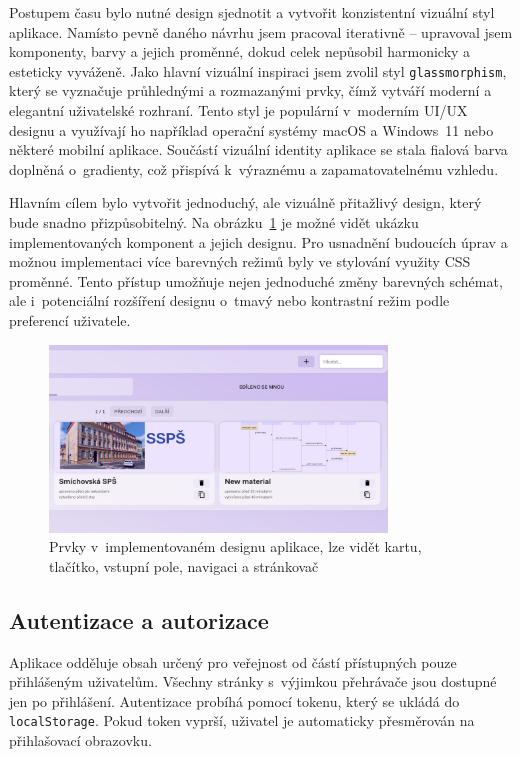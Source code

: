 Postupem času bylo nutné design sjednotit a vytvořit konzistentní vizuální styl aplikace.
Namísto pevně daného návrhu jsem pracoval iterativně -- upravoval jsem komponenty, barvy a jejich proměnné, dokud celek nepůsobil harmonicky a esteticky vyváženě. 
Jako hlavní vizuální inspiraci jsem zvolil styl \texttt{glassmorphism}, který se vyznačuje průhlednými a rozmazanými prvky, čímž vytváří moderní a elegantní uživatelské rozhraní.
Tento styl je populární v~moderním UI/UX designu a využívají ho například operační systémy macOS a Windows~11 nebo některé mobilní aplikace.
Součástí vizuální identity aplikace se stala fialová barva doplněná o~gradienty, což přispívá k~výraznému a zapamatovatelnému vzhledu.

Hlavním cílem bylo vytvořit jednoduchý, ale vizuálně přitažlivý design, který bude snadno přizpůsobitelný.
Na obrázku~\ref{fig:realizace/design} je možné vidět ukázku implementovaných komponent a jejich designu.
Pro usnadnění budoucích úprav a možnou implementaci více barevných režimů byly ve stylování využity CSS proměnné.
Tento přístup umožňuje nejen jednoduché změny barevných schémat, ale i~potenciální rozšíření designu o~tmavý nebo kontrastní režim podle preferencí uživatele.



\begin{figure}[ht!]
    \centering
    \includegraphics[width=0.8\textwidth]{media/05_realizace/design.png}
    \caption[Prvky v~implementovaném designu aplikace]{Prvky v~implementovaném designu aplikace, lze vidět kartu, tlačítko, vstupní pole, navigaci a stránkovač}
    \label{fig:realizace/design}
\end{figure}


\subsection{Autentizace a autorizace}

Aplikace odděluje obsah určený pro veřejnost od částí přístupných pouze přihlášeným uživatelům. 
Všechny stránky s~výjimkou přehrávače jsou dostupné jen po přihlášení. 
Autentizace probíhá pomocí tokenu, který se ukládá do \texttt{localStorage}. 
Pokud token vyprší, uživatel je automaticky přesměrován na přihlašovací obrazovku.

